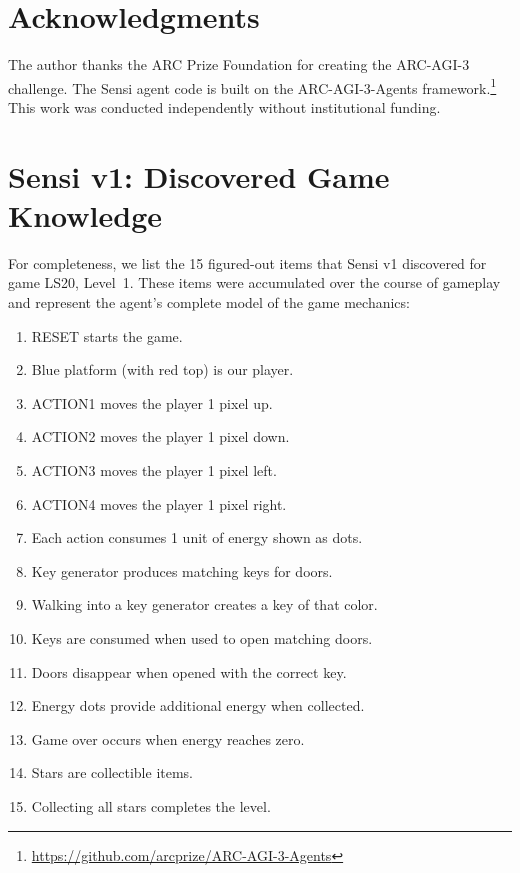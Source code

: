 \documentclass[11pt,letterpaper]{article}
\begin{document}
\section*{Acknowledgments}

The author thanks the ARC Prize Foundation for creating the ARC-AGI-3 challenge. The Sensi agent code is built on the ARC-AGI-3-Agents framework.\footnote{\url{https://github.com/arcprize/ARC-AGI-3-Agents}} This work was conducted independently without institutional funding.





\appendix

\section{Sensi v1: Discovered Game Knowledge}
\label{app:v1_knowledge}

For completeness, we list the 15 figured-out items that Sensi v1 discovered for game LS20, Level~1. These items were accumulated over the course of gameplay and represent the agent's complete model of the game mechanics:

\begin{enumerate}[leftmargin=2em]
  \item RESET starts the game.
  \item Blue platform (with red top) is our player.
  \item ACTION1 moves the player 1 pixel up.
  \item ACTION2 moves the player 1 pixel down.
  \item ACTION3 moves the player 1 pixel left.
  \item ACTION4 moves the player 1 pixel right.
  \item Each action consumes 1 unit of energy shown as dots.
  \item Key generator produces matching keys for doors.
  \item Walking into a key generator creates a key of that color.
  \item Keys are consumed when used to open matching doors.
  \item Doors disappear when opened with the correct key.
  \item Energy dots provide additional energy when collected.
  \item Game over occurs when energy reaches zero.
  \item Stars are collectible items.
  \item Collecting all stars completes the level.
\end{enumerate}
\end{document}
